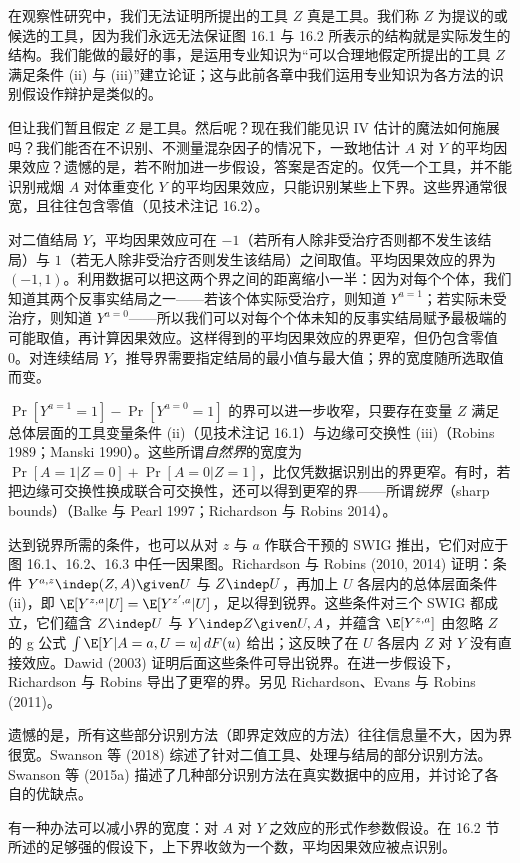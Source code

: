 在观察性研究中，我们无法证明所提出的工具 $Z$ 真是工具。我们称 $Z$ 为提议的或候选的工具，因为我们永远无法保证图 16.1 与 16.2 所表示的结构就是实际发生的结构。我们能做的最好的事，是运用专业知识为“可以合理地假定所提出的工具 $Z$ 满足条件 (ii) 与 (iii)”建立论证；这与此前各章中我们运用专业知识为各方法的识别假设作辩护是类似的。

但让我们暂且假定 $Z$ 是工具。然后呢？现在我们能见识 IV 估计的魔法如何施展吗？我们能否在不识别、不测量混杂因子的情况下，一致地估计 $A$ 对 $Y$ 的平均因果效应？遗憾的是，若不附加进一步假设，答案是否定的。仅凭一个工具，并不能识别戒烟 $A$ 对体重变化 $Y$ 的平均因果效应，只能识别某些上下界。这些界通常很宽，且往往包含零值（见技术注记 16.2）。

\begin{techpoint}[因果效应的部分识别]
对二值结局 $Y$，平均因果效应可在 $-1$（若所有人除非受治疗否则都不发生该结局）与 $1$（若无人除非受治疗否则发生该结局）之间取值。平均因果效应的界为 $(-1,1)$。利用数据可以把这两个界之间的距离缩小一半：因为对每个个体，我们知道其两个反事实结局之一——若该个体实际受治疗，则知道 $Y^{a=1}$；若实际未受治疗，则知道 $Y^{a=0}$——所以我们可以对每个个体未知的反事实结局赋予最极端的可能取值，再计算因果效应。这样得到的平均因果效应的界更窄，但仍包含零值 0。对连续结局 $Y$，推导界需要指定结局的最小值与最大值；界的宽度随所选取值而变。

$\Pr[Y^{a=1}=1]-\Pr[Y^{a=0}=1]$ 的界可以进一步收窄，只要存在变量 $Z$ 满足总体层面的工具变量条件 (ii)（见技术注记 16.1）与边缘可交换性 (iii)（Robins 1989；Manski 1990）。这些所谓\emph{自然界}的宽度为 $\Pr[A=1|Z=0]+\Pr[A=0|Z=1]$，比仅凭数据识别出的界更窄。有时，若把边缘可交换性换成联合可交换性，还可以得到更窄的界——所谓\emph{锐界}（sharp bounds）（Balke 与 Pearl 1997；Richardson 与 Robins 2014）。

达到锐界所需的条件，也可以从对 $z$ 与 $a$ 作联合干预的 SWIG 推出，它们对应于图 16.1、16.2、16.3 中任一因果图。Richardson 与 Robins (2010, 2014) 证明：条件 $Y^{a,z}\indep(Z,A)\given U$ 与 $Z\indep U$，再加上 $U$ 各层内的总体层面条件 (ii)，即 $\E[Y^{z,a}|U]=\E[Y^{z',a}|U]$，足以得到锐界。这些条件对三个 SWIG 都成立，它们蕴含 $Z\indep U$ 与 $Y\indep Z\given U,A$，并蕴含 $\E[Y^{z,a}]$ 由忽略 $Z$ 的 g 公式 $\int \E[Y|A=a,U=u]\,dF(u)$ 给出；这反映了在 $U$ 各层内 $Z$ 对 $Y$ 没有直接效应。Dawid (2003) 证明后面这些条件可导出锐界。在进一步假设下，Richardson 与 Robins 导出了更窄的界。另见 Richardson、Evans 与 Robins (2011)。

遗憾的是，所有这些部分识别方法（即界定效应的方法）往往信息量不大，因为界很宽。Swanson 等 (2018) 综述了针对二值工具、处理与结局的部分识别方法。Swanson 等 (2015a) 描述了几种部分识别方法在真实数据中的应用，并讨论了各自的优缺点。

有一种办法可以减小界的宽度：对 $A$ 对 $Y$ 之效应的形式作参数假设。在 16.2 节所述的足够强的假设下，上下界收敛为一个数，平均因果效应被点识别。
\end{techpoint}

